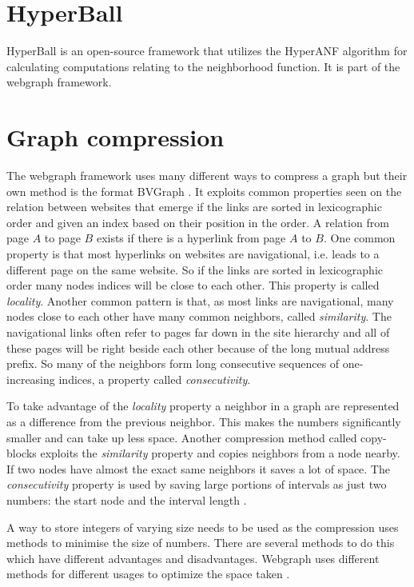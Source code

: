 \section{HyperBall}
HyperBall is an open-source framework that utilizes the HyperANF algorithm for calculating computations relating to the neighborhood function. It is part of the webgraph framework.

\section{Graph compression}
\label{sec:Compression}

The webgraph framework \cite{webgraph} uses many different ways to compress a graph but their own method is the format BVGraph \cite{webgraph-compression}. It exploits common properties seen on the relation between websites that emerge if the links are sorted in lexicographic order and given an index based on their position in the order. A relation from page $A$ to page $B$ exists if there is a hyperlink from page $A$ to $B$. One common property is that most hyperlinks on websites are navigational, i.e. leads to a different page on the same website. So if the links are sorted in lexicographic order many nodes indices will be close to each other. This property is called \emph{locality}. Another common pattern is that, as most links are navigational, many nodes close to each other have many common neighbors, called \emph{similarity}. The navigational links often refer to pages far down in the site hierarchy and all of these pages will be right beside each other because of the long mutual address prefix. So many of the neighbors form long consecutive sequences of one-increasing indices, a property called \emph{consecutivity}.

To take advantage of the \emph{locality} property a neighbor in a graph are represented as a difference from the previous neighbor. This makes the numbers significantly smaller and can take up less space. Another compression method called copy-blocks exploits the \emph{similarity} property and copies neighbors from a node nearby. If two nodes have almost the exact same neighbors it saves a lot of space. The \emph{consecutivity} property is used by saving large portions of intervals as just two numbers: the start node and the interval length \cite{webgraph-compression}. 

A way to store integers of varying size needs to be used as the compression uses methods to minimise the size of numbers. There are several methods to do this which have different advantages and disadvantages. Webgraph uses different methods for different usages to optimize the space taken \cite{webgraph-compression}. 

